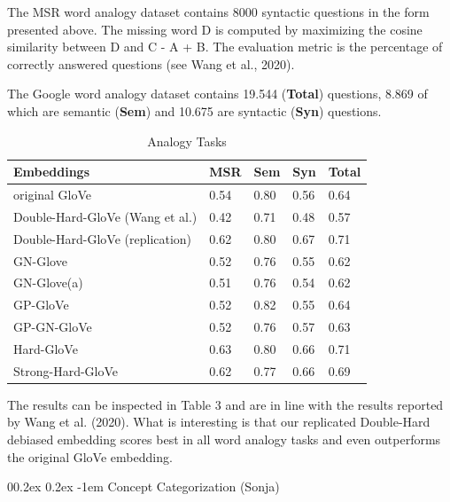 \documentclass[
  english,
  man,floatsintext]{apa6}
\makeatletter
\let\oldparagraph\paragraph
\renewcommand{\paragraph}[1]{\oldparagraph{#1}\mbox{}}
\renewcommand{\paragraph}{\@startsection{paragraph}{4}{\parindent}%
  {0\baselineskip \@plus 0.2ex \@minus 0.2ex}%
  {-1em}%
  {\normalfont\normalsize\bfseries\itshape\typesectitle}}
\makeatother
\begin{document}
The MSR word analogy dataset contains 8000 syntactic questions in the form presented above. The missing word D is computed by maximizing the cosine similarity between D and C - A + B. The evaluation metric is the percentage of correctly answered questions (see Wang et al., 2020).

The Google word analogy dataset contains 19.544 (\textbf{Total}) questions, 8.869 of which are semantic (\textbf{Sem}) and 10.675 are syntactic (\textbf{Syn}) questions.

\begin{table}[tbp]

\begin{center}
\begin{threeparttable}

\caption{\label{tab:table 3}Analogy Tasks}

\begin{tabular}{lllll}
\toprule
Embeddings & MSR & Sem & Syn & Total\\
\midrule
original GloVe & 0.54 & 0.80 & 0.56 & 0.64\\
Double-Hard-GloVe (Wang et al.) & 0.42 & 0.71 & 0.48 & 0.57\\
Double-Hard-GloVe (replication) & 0.62 & 0.80 & 0.67 & 0.71\\
GN-Glove & 0.52 & 0.76 & 0.55 & 0.62\\
GN-Glove(a) & 0.51 & 0.76 & 0.54 & 0.62\\
GP-GloVe & 0.52 & 0.82 & 0.55 & 0.64\\
GP-GN-GloVe & 0.52 & 0.76 & 0.57 & 0.63\\
Hard-GloVe & 0.63 & 0.80 & 0.66 & 0.71\\
Strong-Hard-GloVe & 0.62 & 0.77 & 0.66 & 0.69\\
\bottomrule
\end{tabular}

\end{threeparttable}
\end{center}

\end{table}

The results can be inspected in Table 3 and are in line with the results reported by Wang et al. (2020). What is interesting is that our replicated Double-Hard debiased embedding scores best in all word analogy tasks and even outperforms the original GloVe embedding.

\hypertarget{concept-categorization-sonja}{%
\paragraph{Concept Categorization (Sonja)}\label{concept-categorization-sonja}}
\end{document}
